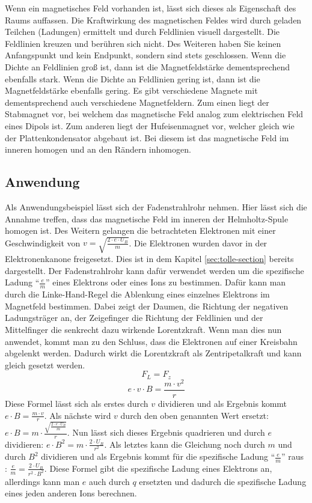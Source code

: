 Wenn ein magnetisches Feld vorhanden ist, lässt sich dieses als Eigenschaft des Raums auffassen.
Die Kraftwirkung des magnetischen Feldes wird durch geladen Teilchen (Ladungen) ermittelt und durch Feldlinien visuell dargestellt.
Die Feldlinien kreuzen und berühren sich nicht.
Des Weiteren haben Sie keinen Anfangspunkt und kein Endpunkt, sondern sind stets geschlossen.
Wenn die Dichte an Feldlinien groß ist, dann ist die Magnetfeldstärke dementsprechend ebenfalls stark.
Wenn die Dichte an Feldlinien gering ist, dann ist die Magnetfeldstärke ebenfalls gering.
Es gibt verschiedene Magnete mit dementsprechend auch verschiedene Magnetfeldern. 
Zum einen liegt der Stabmagnet vor, bei welchem das magnetische Feld analog zum elektrischen Feld eines Dipols ist.
Zum anderen liegt der Hufeisenmagnet vor, welcher gleich wie der Plattenkondensator abgebaut ist.
Bei diesem ist das magnetische Feld im inneren homogen und an den Rändern inhomogen. 
\subsection{Anwendung}
\label{sec:Fadenstrahlrohr}
Als Anwendungsbeispiel lässt sich der Fadenstrahlrohr nehmen.
Hier lässt sich die Annahme treffen, dass das magnetische Feld im inneren der Helmholtz-Spule homogen ist. Des Weitern gelangen die betrachteten Elektronen mit einer Geschwindigkeit von $v=\sqrt{\frac{2 \cdot e \cdot U_B}{m}}$. Die Elektronen wurden davor in der Elektronenkanone freigesetzt.
Dies ist in dem Kapitel \ref{sec:tolle-section} bereits dargestellt. 
Der Fadenstrahlrohr kann dafür verwendet werden um die spezifische Ladung "`$\frac{e}{m}$"' eines Elektrons oder eines Ions zu bestimmen.
Dafür kann man durch die Linke-Hand-Regel die Ablenkung eines einzelnes Elektrons im Magnetfeld bestimmen. Dabei zeigt der Daumen, die Richtung der negativen Ladungsträger an, der Zeigefinger die Richtung der Feldlinien und der Mittelfinger die senkrecht dazu wirkende Lorentzkraft.
Wenn man dies nun anwendet, kommt man zu den Schluss, dass die Elektronen auf einer Kreisbahn abgelenkt werden. 
Dadurch wirkt die Lorentzkraft als Zentripetalkraft und kann gleich gesetzt werden.
$$F_L = F_z$$
$$e \cdot v \cdot B = \frac{m \cdot v^2}{r}$$
Diese Formel lässt sich als erstes durch $v$ dividieren und als Ergebnis kommt $e \cdot B = \frac{m \cdot v}{r}$.
Als nächste wird $v$ durch den oben genannten Wert %
ersetzt: $e \cdot B = m \cdot \frac{\sqrt{\frac{2 \cdot e \cdot U_B}{m}}}{r}$.
Nun lässt sich dieses Ergebnis quadrieren und durch $e$ dividieren: $e \cdot B^2 = m \cdot \frac{2 \cdot U_B}{r^2}$.
Als letztes kann die Gleichung noch durch $m$ und durch $B^2$ dividieren und als Ergebnis kommt für die spezifische Ladung "`$\frac{e}{m}$"' raus : $\frac{e}{m} = \frac{2 \cdot U_B}{ r^2 \cdot B^2}$.
Diese Formel gibt die spezifische Ladung eines Elektrons an, allerdings kann man $e$ auch durch $q$ ersetzten und dadurch die spezifische Ladung eines jeden anderen Ions berechnen.
